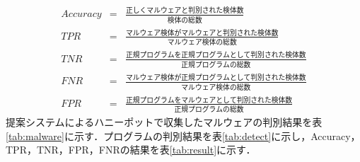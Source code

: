 \begin{eqnarray}
    Accuracy & = & \frac{正しくマルウェアと判別された検体数}{検体の総数}\\
    TPR & = & \frac{マルウェア検体がマルウェアと判別された検体数}{マルウェア検体の総数}\\
    TNR & = & \frac{正規プログラムを正規プログラムとして判別された検体数}{正規プログラムの総数}\\
    FNR & = & \frac{マルウェア検体が正規プログラムとして判別された検体数}{マルウェア検体の総数}\\ 
    FPR & = & \frac{正規プログラムをマルウェアとして判別された検体数}{正規プログラムの総数}
\end{eqnarray}
提案システムによるハニーポットで収集したマルウェアの判別結果を表\ref{tab:malware}に示す．プログラムの判別結果を表\ref{tab:detect}に示し，Accuracy，TPR，TNR，FPR，FNRの結果を表\ref{tab:result}に示す．
